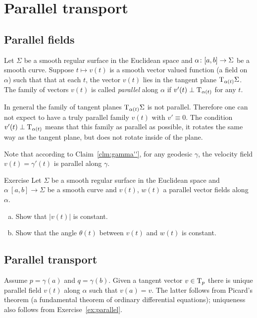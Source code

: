 \chapter{Parallel transport}

\section{Parallel fields}

Let $\Sigma$ be a smooth regular surface in the Euclidean space and $\alpha\:[a,b]\z\to \Sigma$ be a smooth curve.
Suppose $t\mapsto v(t)$ is a smooth vector valued function (a field on $\alpha$) such that
that at each $t$, the vector $v(t)$ lies in the tangent plane $\mathrm{T}_{\alpha(t)}\Sigma$.
The family of vectors $v(t)$ is called \emph{parallel} along $\alpha$ if $v'(t)\perp\mathrm{T}_{\alpha(t)}$ for any $t$.

In general the family of tangent planes $\mathrm{T}_{\alpha(t)}\Sigma$ is not parallel.
Therefore one can not expect to have a truly parallel family $v(t)$ with $v'\equiv 0$.
The condition $v'(t)\perp\mathrm{T}_{\alpha(t)}$ means that this family as parallel as possible, it rotates the same way as the tangent plane, but does not rotate inside of the plane.

Note that according to Claim~\ref{clm:gamma''}, for any geodesic $\gamma$, the velocity field $v(t)=\gamma'(t)$ is parallel along $\gamma$.


\begin{thm}{Exercise}\label{ex:parallel}
Let $\Sigma$ be a smooth regular surface in the Euclidean space and $\alpha\:[a,b]\to \Sigma$ be a smooth curve and $v(t)$, $w(t)$ a parallel vector fields along $\alpha$.
\begin{enumerate}[(a)]
 \item Show that $|v(t)|$ is constant.
 \item Show that the angle $\theta(t)$ between $v(t)$ and $w(t)$ is constant.
\end{enumerate}
\end{thm}

\section{Parallel transport}

Assume $p=\gamma(a)$ and $q=\gamma(b)$.
Given a tangent vector $v\in\mathrm{T}_p$ there is unique parallel field $v(t)$ along $\alpha$ such that $v(a)=v$.
The latter follows from Picard's theorem (a fundamental theorem of ordinary differential equations); uniqueness also follows from Exercise~\ref{ex:parallel}.

